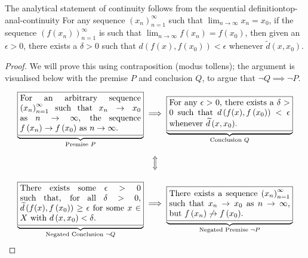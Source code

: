 \documentclass{article}
\numberwithin{equation}{section}
\numberwithin{figure}{section}
\begin{document}
\begin{theorem}{The analytical statement of continuity follows from the
        sequential definition}{top-anal-continuity}
    For any sequence $ \left(x_n\right)_{n=1}^\infty $ such that $ \lim_{n \to
    \infty} x_n = x_0 $, if the sequence $
    \left(f\left(x_n\right)\right)_{n=1}^\infty $ is such that $ \lim_{n \to
    \infty} f\left(x_n\right) = f\left(x_0\right) $, then given an $ \epsilon >
    0 $, there exists a $ \delta > 0 $ such that $ d\left(f(x),
    f\left(x_0\right)\right) < \epsilon $ whenever $ \widetilde{d}\left(x,
    x_0\right) $.
    \begin{proof}
        We will prove this using contraposition (modus tollens); the argument is
        visualised below with the premise $ P $ and conclusion $ Q $, to argue
        that $ \lnot Q \implies \lnot P $.

        \begingroup
            \renewcommand\fboxsep{.8em}
            \begin{align*} %
                \underbrace{\mathrm{\fbox{\parbox{.42\linewidth}{
                    For an arbitrary sequence $ \left(x_n\right)_{n=1}^\infty $
                    such that $ x_n \to x_0 $ as $ n \to \infty $, the sequence
                    $ f\left( x_n \right) \to f\left( x_0 \right) $ as $ n \to
                    \infty $.
                }}}}_{\text{Premise } P}&\implies
                \underbrace{\mathrm{\fbox{\parbox{.42\linewidth}{
                    For any $ \epsilon > 0 $, there exists a $ \delta > 0 $ such
                    that $ d\left( f(x), f\left( x_0 \right) \right) < \epsilon
                    $ whenever $ \widetilde{d}\left( x, x_0 \right) $.
                }}}}_{\text{Conclusion } Q} \\
                &\tikz\node[rotate=90, minimum size=1cm] {$ \iff $}; \\
                \underbrace{\mathrm{\fbox{\parbox{.42\linewidth}{
                    There exists some $ \epsilon > 0 $ such that, for all $
                    \delta > 0 $, $ \widetilde{d}\left( f(x), f\left(x_0\right)
                    \right) \geq \epsilon $ for some $ x \in X $ with $ d\left(
                    x, x_0 \right) < \delta $.
                }}}}_{\text{Negated Conclusion } \lnot Q}&\implies
                \underbrace{\mathrm{\fbox{\parbox{.42\linewidth}{
                    There exists a sequence $ \left(x_n\right)_{n=1}^\infty $
                    such that $ x_n \to x_0 $ as $ n \to \infty $, but $ f\left(
                    x_n \right) \not\to f\left( x_0 \right) $.
                }}}}_{\text{Negated Premise } \lnot P}
            \end{align*}
        \endgroup


\end{proof}
\end{theorem}
\end{document}
